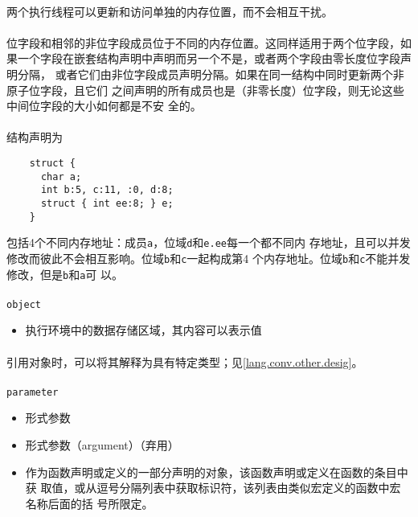 \paragraph{}
\notes 两个执行线程可以更新和访问单独的内存位置，而不会相互干扰。

\paragraph{}
\notes 位字段和相邻的非位字段成员位于不同的内存位置。这同样适用于两个位字段，如
果一个字段在嵌套结构声明中声明而另一个不是，或者两个字段由零长度位字段声明分隔，
或者它们由非位字段成员声明分隔。如果在同一结构中同时更新两个非原子位字段，且它们
之间声明的所有成员也是（非零长度）位字段，则无论这些中间位字段的大小如何都是不安
全的。

\paragraph{}
\ex* 结构声明为
\begin{lstlisting}
    struct {
      char a;
      int b:5, c:11, :0, d:8;
      struct { int ee:8; } e;
    }
\end{lstlisting}
包括4个不同内存地址：成员\texttt{a}，位域\texttt{d}和\texttt{e.ee}每一个都不同内
存地址，且可以并发修改而彼此不会相互影响。位域\texttt{b}和\texttt{c}一起构成第4
个内存地址。位域\texttt{b}和\texttt{c}不能并发修改，但是\texttt{b}和\texttt{a}可
以。

\paragraph{}
\texttt{object}
\begin{itemize}
  \item[]{执行环境中的数据存储区域，其内容可以表示值}
\end{itemize}

\paragraph{}
\notes* 引用对象时，可以将其解释为具有特定类型；见\ref{lang.conv.other.desig}。

\paragraph{}
\texttt{parameter}
\begin{itemize}
  \item[]{形式参数}
  \item[]{形式参数（argument）（弃用）}
  \item[]{作为函数声明或定义的一部分声明的对象，该函数声明或定义在函数的条目中获
    取值，或从逗号分隔列表中获取标识符，该列表由类似宏定义的函数中宏名称后面的括
    号所限定。}
\end{itemize}

